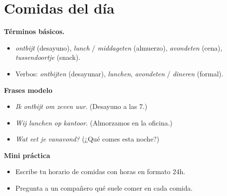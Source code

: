 \section{Comidas del día}
\textbf{Términos básicos.}
\begin{itemize}[leftmargin=*]
  \item \textit{ontbijt} (desayuno), \textit{lunch} / \textit{middageten} (almuerzo), \textit{avondeten} (cena), \textit{tussendoortje} (snack).
  \item Verbos: \textit{ontbijten} (desayunar), \textit{lunchen}, \textit{avondeten} / \textit{dineren} (formal).
\end{itemize}

\textbf{Frases modelo}
\begin{itemize}[leftmargin=*]
  \item \textit{Ik ontbijt om zeven uur}. (Desayuno a las 7.)
  \item \textit{Wij lunchen op kantoor}. (Almorzamos en la oficina.)
  \item \textit{Wat eet je vanavond?} (¿Qué comes esta noche?)
\end{itemize}

\textbf{Mini práctica}
\begin{itemize}[leftmargin=*]
  \item Escribe tu horario de comidas con horas en formato 24h.
  \item Pregunta a un compañero qué suele comer en cada comida.
\end{itemize}
